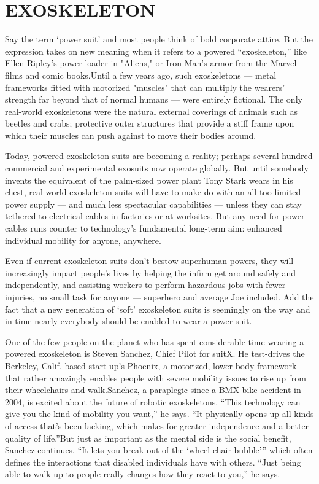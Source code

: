 \documentclass[12pt]{article}
\begin{document}
\newpage

\section{EXOSKELETON}

Say the term ‘power suit’ and most people think of bold corporate attire. But the expression takes on new meaning when it refers to a powered “exoskeleton,” like Ellen Ripley’s power loader in "Aliens," or Iron Man’s armor from the Marvel films and comic books.Until a few years ago, such exoskeletons — metal frameworks fitted with motorized "muscles" that can multiply the wearers’ strength far beyond that of normal humans — were entirely fictional. The only real-world exoskeletons were the natural external coverings of animals such as beetles and crabs; protective outer structures that provide a stiff frame upon which their muscles can push against to move their bodies around.

\indent

Today, powered exoskeleton suits are becoming a reality; perhaps several hundred commercial and experimental exosuits now operate globally. But until somebody invents the equivalent of the palm-sized power plant Tony Stark wears in his chest, real-world exoskeleton suits will have to make do with an all-too-limited power supply — and much less spectacular capabilities — unless they can stay tethered to electrical cables in factories or at worksites. But any need for power cables runs counter to technology’s fundamental long-term aim: enhanced individual mobility for anyone, anywhere.

\indent

Even if current exoskeleton suits don’t bestow superhuman powers, they will increasingly impact people’s lives by helping the infirm get around safely and independently, and assisting workers to perform hazardous jobs with fewer injuries, no small task for anyone — superhero and average Joe included. Add the fact that a new generation of ‘soft’ exoskeleton suits is seemingly on the way and in time nearly everybody should be enabled to wear a power suit.

\indent

One of the few people on the planet who has spent considerable time wearing a powered exoskeleton is Steven Sanchez, Chief Pilot for suitX. He test-drives the Berkeley, Calif.-based start-up’s Phoenix, a motorized, lower-body framework that rather amazingly enables people with severe mobility issues to rise up from their wheelchairs and walk.Sanchez, a paraplegic since a BMX bike accident in 2004, is excited about the future of robotic exoskeletons. “This technology can give you the kind of mobility you want,” he says. “It physically opens up all kinds of access that’s been lacking, which makes for greater independence and a better quality of life.”But just as important as the mental side is the social benefit, Sanchez continues. “It lets you break out of the ‘wheel-chair bubble’” which often defines the interactions that disabled individuals have with others. “Just being able to walk up to people really changes how they react to you,” he says.
\end{document}
